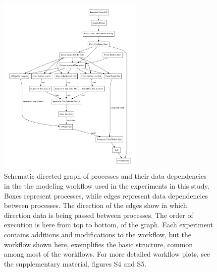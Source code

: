 \documentclass[utf8]{frontiersSCNS} %
\begin{document}
\begin{figure}[h!]
\begin{center}
\includegraphics[width=0.63\textwidth]{figures/fig1_schematic_workflow.pdf}
    \caption{Schematic directed graph of processes and their data
    dependencies in the the modeling workflow used in the experiments in this
    study. Boxes represent processes, while edges represent data dependencies
    between processes. The direction of the edges show in which direction
    data is being passed between processes. The order of execution is here
    from top to bottom, of the graph. Each experiment contains additions and
    modifications to the workflow, but the workflow shown here, exemplifies
    the basic structure, common among most of the workflows. For more
    detailed workflow plots, see the supplementary material, figures S4 and S5.}
    \label{fig:workflow_graph_clean}
\end{center}
\end{figure}
\end{document}
